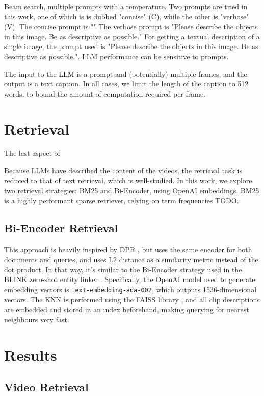 \documentclass{article}
\begin{document}
Beam search, multiple prompts with a temperature.
Two prompts are tried in this work, one of which is is dubbed "concise" (C), while the other is "verbose" (V).
The concise prompt is ""
The verbose prompt is "Please describe the objects in this image. Be as descriptive as possible."
For getting a textual description of a single image, the prompt used is "Please describe the objects in this image. Be as descriptive as possible.".
LLM performance can be sensitive to prompts.

The input to the LLM is a prompt and (potentially) multiple frames, and the output is a text caption.
In all cases, we limit the length of the caption to 512 words, to bound the amount of computation required per frame.

\section{Retrieval}

The last aspect of 

Because LLMs have described the content of the videos, the retrieval task is reduced to that of text retrieval, which is well-studied.
In this work, we explore two retrieval strategies: BM25 and Bi-Encoder, using OpenAI embeddings.
BM25 is a highly performant sparse retriever, relying on term frequencies TODO.

\subsection{Bi-Encoder Retrieval}

This approach is heavily inspired by DPR \cite{dpr}, but uses the same encoder for both documents and queries, and uses L2 distance as a similarity metric instead of the dot product.
In that way, it's similar to the Bi-Encoder strategy used in the BLINK zero-shot entity linker \cite{blink}.
Specifically, the OpenAI model used to generate embedding vectors is \verb|text-embedding-ada-002|, which outputs 1536-dimensional vectors.
The KNN is performed using the FAISS library \cite{faiss}, and all clip descriptions are embedded and stored in an index beforehand, making querying for nearest neighbours very fast.

\section{Results}

\subsection{Video Retrieval}
\end{document}
